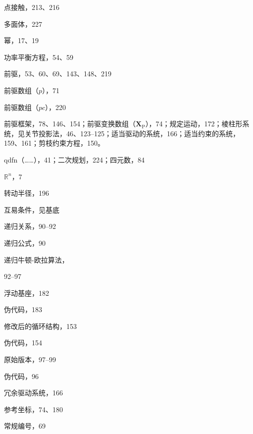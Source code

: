 \documentclass[10pt,a4paper]{book}
\theoremstyle{thmstyle} %
\theoremstyle{defstyle} %
\theoremstyle{prostyle} %
\begin{document}
点接触，213、216



多面体，227



幂，17、19



功率平衡方程，54、59



前驱，53、60、69、143、148、219



前驱数组（$p$），71



前驱数组（$pc$），220



前驱框架，78、146、154；前驱变换数组（$\mathbf{X}_{\mathrm{P}}$），74；规定运动，172；棱柱形系统，见关节投影法，46、123–125；适当驱动的系统，166；适当约束的系统，159、161；剪枝约束方程，150。



qdfn（……），41；二次规划，224；四元数，84



$\mathbb{R}^{n}$，7



转动半径，196



互易条件，见基底



递归关系，90–92



递归公式，90



递归牛顿-欧拉算法，



92–97



浮动基座，182



伪代码，183



修改后的循环结构，153



伪代码，154



原始版本，97–99



伪代码，96



冗余驱动系统，166



参考坐标，74、180



常规编号，69
\end{document}
